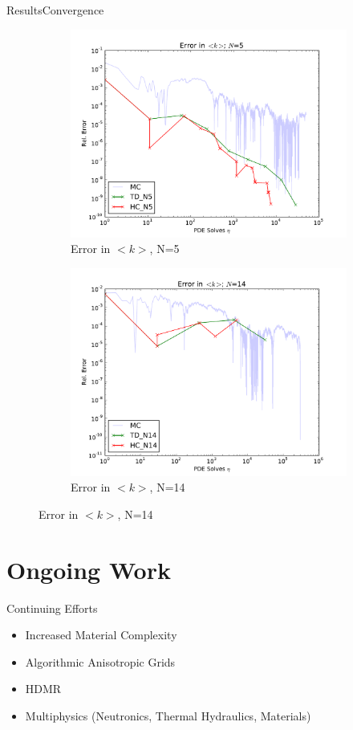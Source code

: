 \documentclass{beamer}
\begin{document}
\begin{frame}{Results}{Convergence}
  \begin{figure}[h!]
    \centering
    \begin{subfigure}[b]{0.49 \textwidth}
      \includegraphics[width=\textwidth]{../graphics/err_5}
      \caption{Error in $<k>$, N=5}
      \label{err_5}
    \end{subfigure}
    \begin{subfigure}[b]{0.49 \textwidth}
      \includegraphics[width=\textwidth]{../graphics/err_14}
      \caption{Error in $<k>$, N=14}
      \label{err_14}
    \end{subfigure}
  \end{figure}
\end{frame}

\section{Ongoing Work}
\begin{frame}{Continuing Efforts}
\begin{itemize}
\item Increased Material Complexity
\item Algorithmic Anisotropic Grids
\item HDMR
\item Multiphysics (Neutronics, Thermal Hydraulics, Materials)
\end{itemize}
\end{frame}
\end{document}
